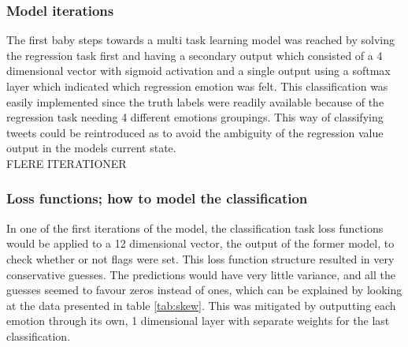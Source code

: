\subsubsection*{Model iterations}
The first baby steps towards a multi task learning model was reached by solving the regression task first and having a secondary output which consisted of a 4 dimensional vector with sigmoid activation and a single output using a softmax layer which indicated which regression emotion was felt. This classification was easily implemented since the truth labels were readily available because of the regression task needing 4 different emotions groupings. This way of classifying tweets could be reintroduced as to avoid the ambiguity of the regression value output in the models current state.\\
FLERE ITERATIONER

\subsubsection*{Loss functions; how to model the classification}
In one of the first iterations of the model, the classification task loss functions would be applied to a 12 dimensional vector, the output of the former model, to check whether or not flags were set. This loss function structure resulted in very conservative guesses. The predictions would have very little variance, and all the guesses seemed to favour zeros instead of ones, which can be explained by looking at the data presented in table \ref{tab:skew}. This was mitigated by outputting each emotion through its own, 1 dimensional layer with separate weights for the last classification. \\
\begin{table}[h]
\caption{The actual flags set and percentage of the full classification dataset}
\label{tab:skew}
\end{table}\\

